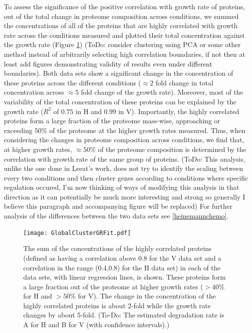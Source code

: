 \documentclass[notitlepage]{article}
\begin{document}
To assess the significance of the positive correlation with growth rate of proteins, out of the total change in proteome composition across conditions, we summed the concentrations of all of the proteins that are highly correlated with growth rate across the conditions measured and plotted their total concentration against the growth rate (Figure \ref{fig:globalgrcorr})
(ToDo: consider clustering using PCA or some other method instead of arbitrarily selecting high correlation boundaries, if not then at least add figures demonstrating validity of results even under different boundaries).
Both data sets show a significant change in the concentration of these proteins across the different conditions ($\approx 2$ fold change in total concentration across $\approx 5$ fold change of the growth rate).
Moreover, most of the variability of the total concentration of these proteins can be explained by the growth rate ($R^2$ of $0.75$ in H and $0.99$ in V). 
Importantly, the highly correlated proteins form a large fraction of the proteome mass-wise, approaching or exceeding $50\%$ of the proteome at the higher growth rates measured.
Thus, when considering the changes in proteome composition across conditions, we find that, at higher growth rates, $\approx 50\%$ of the proteome composition is determined by the correlation with growth rate of the same group of proteins.
(ToDo: This analysis, unlike the one done in Leeat's work, does not try to identify the scaling between every two conditions and then cluster genes according to conditions where specific regulation occured, I'm now thinking of ways of modifying this analysis in that direction as it can potentially be much more interesting and strong so generally I believe this paragraph and accompanying figure will be replaced)
For further analysis of the differences between the two data sets see \ref{heinemannchemo}.

\begin{figure}[h]
\centering
\texttt{[image: GlobalClusterGRFit.pdf]}
\caption{
The sum of the concentrations of the highly correlated proteins (defined as having a correlation above 0.8 for the V data set and a correlation in the range (0.4,0.8) for the H data set) in each of the data sets, with linear regression lines, is shown.
These proteins form a large fraction out of the proteome at higher growth rates ($>40\%$ for H and $>50\%$ for V).
The change in the concentration of the highly correlated proteins is about 2-fold while the growth rate changes by about 5-fold.
(To-Do: The estimated degradation rate is A for H and B for V (with confidence intervals).)
}
\label{fig:globalgrcorr}
\end{figure}
\end{document}
